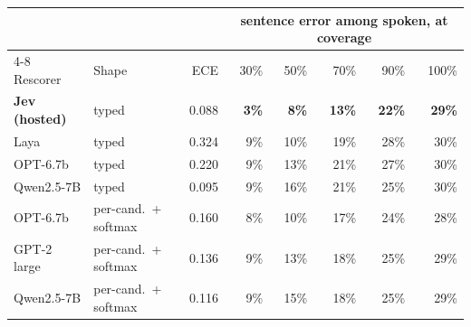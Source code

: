 \begin{tabular}{llrrrrrr}
\toprule
 & & & \multicolumn{5}{c}{sentence error among spoken, at coverage} \\
\cmidrule(lr){4-8}
Rescorer & Shape & ECE & 30\% & 50\% & 70\% & 90\% & 100\% \\
\midrule
\bf Jev (hosted) & typed & 0.088 & \bf 3\% & \bf 8\% & \bf 13\% & \bf 22\% & \bf 29\% \\
Laya & typed & 0.324 & 9\% & 10\% & 19\% & 28\% & 30\% \\
OPT-6.7b & typed & 0.220 & 9\% & 13\% & 21\% & 27\% & 30\% \\
Qwen2.5-7B & typed & 0.095 & 9\% & 16\% & 21\% & 25\% & 30\% \\
OPT-6.7b & per-cand.\ + softmax & 0.160 & 8\% & 10\% & 17\% & 24\% & 28\% \\
GPT-2 large & per-cand.\ + softmax & 0.136 & 9\% & 13\% & 18\% & 25\% & 29\% \\
Qwen2.5-7B & per-cand.\ + softmax & 0.116 & 9\% & 15\% & 18\% & 25\% & 29\% \\
\bottomrule
\end{tabular}
